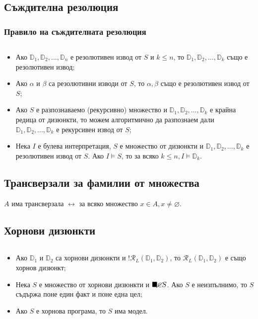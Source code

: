 \documentclass{article}
\begin{document}
\subsection*{Съждителна резолюция}
\subsubsection*{Правило на съждителната резолюция}

\begin{prop}
$\ $
\begin{itemize}
\item Ако $\mathbb{D}_1, \mathbb{D}_2, \ldots, \mathbb{D}_n$ е резолютивен извод от $S$ и $k \leq n$, то $\mathbb{D}_1, \mathbb{D}_2, \ldots, \mathbb{D}_k$ също е резолютивен извод;
\item Ако $\alpha$ и $\beta$ са резолютивни изводи от $S$, то $\alpha, \beta$ също е резолютивен извод от $S$;
\item Ако $S$ е разпознаваемо (рекурсивно) множество и $\mathbb{D}_1, \mathbb{D}_2, \ldots, \mathbb{D}_k$ е крайна редица от дизюнкти, то можем алгоритмично да разпознаем дали $\mathbb{D}_1, \mathbb{D}_2, \ldots, \mathbb{D}_k$ е рекурсивен извод от $S$;
\item Нека $I$ е булева интерпретация, $S$ е множество от дизюнкти и $\mathbb{D}_1, \mathbb{D}_2, \ldots, \mathbb{D}_k$ е резолютивен извод от $S$. Ако $I \models S$, то за всяко $k \leq n, I \models \mathbb{D}_k$.
\end{itemize}
\end{prop}


\subsection*{Трансверзали за фамилии от множества}

\begin{prop}
$A$ има трансверзала $\longleftrightarrow$ за всяко множество $x \in A, x \neq \varnothing$.
\end{prop}


\subsection*{Хорнови дизюнкти}

\begin{prop}
$\ $
\begin{itemize}
\item Ако $\mathbb{D}_1$ и $\mathbb{D}_2$ са хорнови дизюнкти и $!\mathcal{R}_L(\mathbb{D}_1, \mathbb{D}_2)$, то $\mathcal{R}_L(\mathbb{D}_1, \mathbb{D}_2)$ е също хорнов дизюнкт;
\item Нека $S$ е множество от хорнови дизюнкти и $\blacksquare \cancel{\in} S$. Ако $S$ е неизпълнимо, то $S$ съдържа поне един факт и поне една цел;
\item Ако $S$ е хорнова програма, то $S$ има модел.
\end{itemize}

\end{prop}
\end{document}
